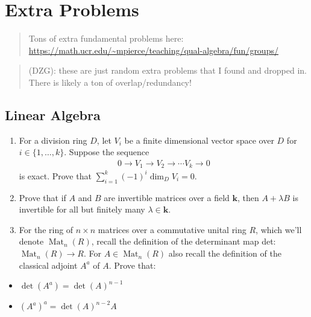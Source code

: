 \hypertarget{extra-problems}{%
\section{Extra Problems}\label{extra-problems}}

\begin{quote}
Tons of extra fundamental problems here:
\url{https://math.ucr.edu/~mpierce/teaching/qual-algebra/fun/groups/}
\end{quote}

\begin{quote}
(DZG): these are just random extra problems that I found and dropped in.
There is likely a ton of overlap/redundancy!
\end{quote}

\hypertarget{linear-algebra}{%
\subsection{Linear Algebra}\label{linear-algebra}}

\begin{enumerate}
\def\labelenumi{\arabic{enumi}.}
\tightlist
\item
  For a division ring \(D\), let \(V_{i}\) be a finite dimensional
  vector space over \(D\) for \(i \in\{1, \ldots, k\}\). Suppose the
  sequence
  \begin{align*}
  0 \longrightarrow V_{1} \longrightarrow V_{2} \longrightarrow \cdots V_{k} \longrightarrow 0
  \end{align*}
  is exact. Prove that
  \(\sum_{i=1}^{k}(-1)^{i} \operatorname{dim}_{D} V_{i}=0\).
\item
  Prove that if \(A\) and \(B\) are invertible matrices over a field
  \(\boldsymbol{k}\), then \(A+\lambda B\) is invertible for all but
  finitely many \(\lambda \in \boldsymbol{k}\).
\item
  For the ring of \(n \times n\) matrices over a commutative unital ring
  \(R\), which we'll denote \(\operatorname{Mat}_{n}(R)\), recall the
  definition of the determinant map det:
  \(\operatorname{Mat}_{n}(R) \rightarrow R\). For
  \(A \in \operatorname{Mat}_{n}(R)\) also recall the definition of the
  classical adjoint \(A^{a}\) of \(A\). Prove that:
\end{enumerate}

\begin{itemize}
\tightlist
\item
  \(\operatorname{det}\left(A^{a}\right)=\operatorname{det}(A)^{n-1}\)
\item
  \(\left(A^{a}\right)^{a}=\operatorname{det}(A)^{n-2} A\)
\end{itemize}

